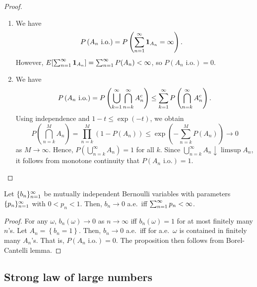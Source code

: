 \documentclass[a4paper]{article}
\begin{document}
\begin{proof}
  \begin{enumerate}
    \item We have
          \begin{align*}
            P \left( A_n \text{ i.o.} \right)
             & = P \left( \sum_{n=1}^\infty \operatorname{\mathbf{1}}_{A_n} = \infty \right).
          \end{align*}
          However, $E [\sum_{n=1}^\infty \operatorname{\mathbf{1}}_{A_n}] = \sum_{n=1}^\infty P (A_n) < \infty$,
          so $P (A_n \text{ i.o.}) = 0$.

    \item We have
          \begin{align*}
            P \left( A_n \text{ i.o.} \right)
            = P \left( \bigcup_{k=1}^\infty \bigcap_{n = k}^\infty A_n^c \right)
            \leq \sum_{k=1}^\infty P \left( \bigcap_{n=k}^\infty A_n^c \right).
          \end{align*}
          Using independence and $1 - t \leq \exp (- t)$,
          we obtain
          \[
            P \left( \bigcap_{n=k}^M A_n \right)
            = \prod_{n=k}^M (1 - P (A_n))
            \leq \exp \left( - \sum_{n=k}^M P (A_n) \right) \to 0
          \]
          as $M \to \infty$. Hence, $P \left( \bigcup_{n=k}^\infty A_n \right)
            = 1$ for all $k$. Since $\bigcup_{n=k}^\infty A_n \downarrow \limsup A_n$,
          it follows from monotone continuity that $P (A_n \text{ i.o.}) = 1$.
  \end{enumerate}
\end{proof}

\begin{prop}
  Let $\{ b_n \}_{n=1}^\infty$ be mutually independent Bernoulli variables
  with parameters $\{ p_n \}_{n=1}^\infty$ with $0 < p_n < 1$.
  Then, $b_n \to 0$ a.e.\ iff $\sum_{n=1}^\infty p_n < \infty$.
\end{prop}

\begin{proof}
  For any $\omega$, $b_n (\omega) \to 0$ as $n \to \infty$ iff
  $b_n (\omega) = 1$ for at most finitely many $n$'s.
  Let $A_n = \left\{ b_n = 1 \right\}$. Then,
  $b_n \to 0$ a.e.\ iff for a.e.\ $\omega$ is contained
  in finitely many $A_n$'s. That is, $P (A_n \text{ i.o.}) = 0$.
  The proposition then follows from Borel-Cantelli lemma.

\end{proof}

\subsection{Strong law of large numbers}
\end{document}

